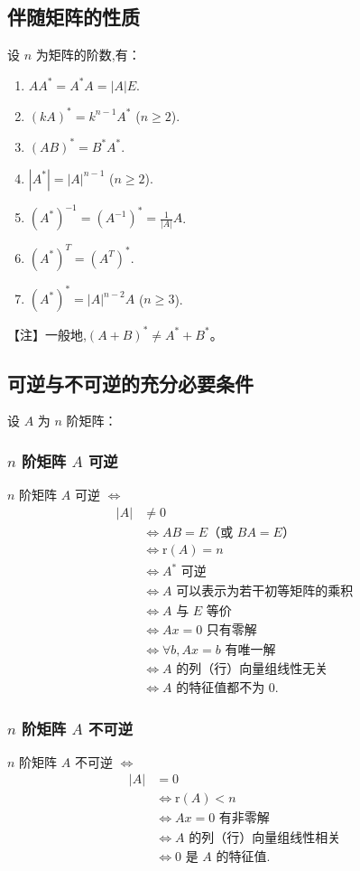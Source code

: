 \documentclass[UTF8]{ctexart}
\theoremstyle{remark}
\begin{document}
	\subsection{伴随矩阵的性质}
	设 \(n\) 为矩阵的阶数,有：
	\begin{enumerate}
		\item \(AA^* = A^*A = |A|E\).
		\item \((kA)^* = k^{n - 1}A^*\) (\(n\geq 2\)).
		\item \((AB)^* = B^*A^*\).
		\item \(|A^*| = |A|^{n - 1}\) (\(n\geq 2\)).
		\item \((A^*)^{-1} = (A^{-1})^* = \frac{1}{|A|}A\).
		\item \((A^*)^T = (A^T)^*\).
		\item \((A^*)^* = |A|^{n - 2}A\) (\(n\geq 3\)).
	\end{enumerate}
	【注】一般地,\((A + B)^* \neq A^* + B^*\)。
	
	\subsection{可逆与不可逆的充分必要条件}
	设 \(A\) 为 \(n\) 阶矩阵：
	\subsubsection{\(n\) 阶矩阵 \(A\) 可逆}
	\(n\) 阶矩阵 \(A\) 可逆 \(\Leftrightarrow\)
	\begin{align*}
		|A| &\neq 0\\
		&\Leftrightarrow AB = E \text{（或 } BA = E\text{）}\\
		&\Leftrightarrow \mathrm{r}(A) = n\\
		&\Leftrightarrow A^* \text{ 可逆}\\
		&\Leftrightarrow A \text{ 可以表示为若干初等矩阵的乘积}\\
		&\Leftrightarrow A \text{ 与 } E \text{ 等价}\\
		&\Leftrightarrow Ax = 0 \text{ 只有零解}\\
		&\Leftrightarrow \forall b, Ax = b \text{ 有唯一解}\\
		&\Leftrightarrow A \text{ 的列（行）向量组线性无关}\\
		&\Leftrightarrow A \text{ 的特征值都不为 } 0.
	\end{align*}
	
	\subsubsection{\(n\) 阶矩阵 \(A\) 不可逆}
	\(n\) 阶矩阵 \(A\) 不可逆 \(\Leftrightarrow\)
	\begin{align*}
		|A| &= 0\\
		&\Leftrightarrow \mathrm{r}(A) < n\\
		&\Leftrightarrow Ax = 0 \text{ 有非零解}\\
		&\Leftrightarrow A \text{ 的列（行）向量组线性相关}\\
		&\Leftrightarrow 0 \text{ 是 } A \text{ 的特征值}.
	\end{align*}
	
\end{document}
